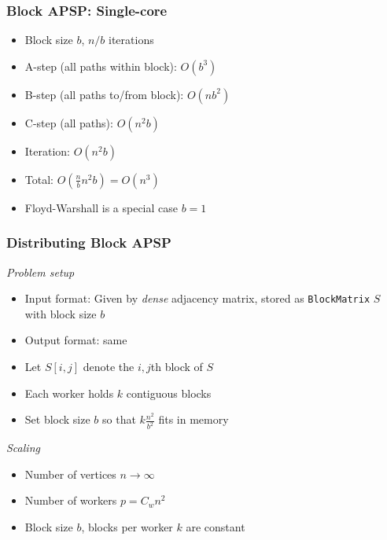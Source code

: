 \documentclass{beamer}
\begin{document}
\begin{frame}
\frametitle{Block APSP: Single-core}
\begin{itemize}
\item Block size $b$, $n/b$ iterations 
\item A-step (all paths within block): $O(b^3)$
\item B-step (all paths to/from block): $O(nb^2)$
\item C-step (all paths): $O(n^2b)$
\item Iteration: $O(n^2 b)$
\item Total: $O(\frac{n}{b} n^2 b) = O(n^3)$
\item Floyd-Warshall is a special case $b = 1$
\end{itemize}
\end{frame}

\begin{frame}
\frametitle{Distributing Block APSP}
\emph{Problem setup}
\begin{itemize}
\item Input format: Given by \emph{dense} adjacency matrix, stored as {\tt BlockMatrix} $S$ with block size $b$
\item Output format: same
\item Let $S[i, j]$ denote the $i, j$th block of $S$
\item Each worker holds $k$ contiguous blocks
\item Set block size $b$ so that $k\frac{n^2}{b^2}$ fits in memory
\end{itemize}
\emph{Scaling}
\begin{itemize}
\item Number of vertices $n \to \infty$
\item Number of workers $p = C_w n^2$
\item Block size $b$, blocks per worker $k$ are constant
\end{itemize}
\end{frame}
\end{document}
